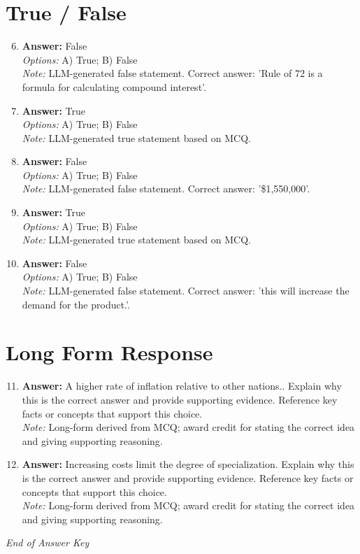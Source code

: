 \documentclass[12pt]{article}
\begin{document}
\section*{True / False}
\begin{enumerate}[label=\arabic*.]
\setcounter{enumi}{5}
\item \textbf{Answer:} False
\\ \textit{Options:} A) True; B) False
\\ \textit{Note:} LLM-generated false statement. Correct answer: 'Rule of 72 is a formula for calculating compound interest'.
\item \textbf{Answer:} True
\\ \textit{Options:} A) True; B) False
\\ \textit{Note:} LLM-generated true statement based on MCQ.
\item \textbf{Answer:} False
\\ \textit{Options:} A) True; B) False
\\ \textit{Note:} LLM-generated false statement. Correct answer: '\$1,550,000'.
\item \textbf{Answer:} True
\\ \textit{Options:} A) True; B) False
\\ \textit{Note:} LLM-generated true statement based on MCQ.
\item \textbf{Answer:} False
\\ \textit{Options:} A) True; B) False
\\ \textit{Note:} LLM-generated false statement. Correct answer: 'this will increase the demand for the product.'.
\end{enumerate}

\section*{Long Form Response}
\begin{enumerate}[label=\arabic*.]
\setcounter{enumi}{10}
\item \textbf{Answer:} A higher rate of inflation relative to other nations.. Explain why this is the correct answer and provide supporting evidence. Reference key facts or concepts that support this choice.
\\ \textit{Note:} Long-form derived from MCQ; award credit for stating the correct idea and giving supporting reasoning.
\item \textbf{Answer:} Increasing costs limit the degree of specialization. Explain why this is the correct answer and provide supporting evidence. Reference key facts or concepts that support this choice.
\\ \textit{Note:} Long-form derived from MCQ; award credit for stating the correct idea and giving supporting reasoning.
\end{enumerate}

\vfill
\noindent\textit{End of Answer Key}
\end{document}
